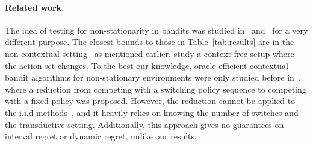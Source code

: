 \begin{table}[t]
\end{table}

\paragraph{Related work.}
The idea of testing for non-stationarity in bandits was studied
in~\citep{BubeckSl12} and~\citep{AuerCh16} for a very different
purpose. 
The closest bounds to those in Table~\ref{tab:results} are in
the non-contextual setting~\citep{AuerCeFrSc02, BesbesGuZe14,
  BesbesGuZe15, WeiHoLu16} as mentioned earlier. \citet{chakrabarti2009mortal} study a context-free setup where
the action set changes. To the best our knowledge, oracle-efficient
contextual bandit algorithms for non-stationary environments were only
studied before in~\citep{SyrgkanisKrSc16}, where a reduction from
competing with a switching policy sequence to competing with a fixed
policy was proposed.  However, the reduction cannot be applied to the
i.i.d methods~\citep{LangfordZh08, AgarwalHsKaLaLiSc14}, and it heavily
relies on knowing the number of switches and the transductive setting. Additionally,
this approach gives no guarantees on interval regret or dynamic
regret, unlike our results.
